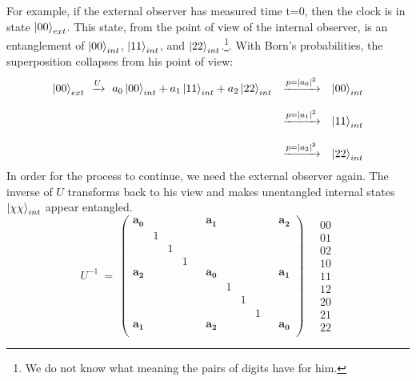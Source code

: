 \documentclass[12pt]{article}
\begin{document}
For example, if the external observer has measured time t=0, then the clock is in state $\ket{00}_{ext}$. This state, from the point of view of the internal observer, is an entanglement of $\ket{00}_{int}$, $\ket{11}_{int}$, and $\ket{22}_{int}$.\footnote{We do not know what meaning the pairs of digits have for him.}. With Born's probabilities, the superposition collapses from his point of view:
\begin{equation*}
\begin{matrix}
\ket{00}_{ext} \ \xrightarrow{U} \ a_0\ket{00}_{int} + a_1\ket{11}_{int} + a_2\ket{22}_{int} 
& \xrightarrow{p = |a_0|^2} & \ket{00}_{int} \\ \\
& \xrightarrow{p = |a_1|^2} & \ket{11}_{int} \\ \\
& \xrightarrow{p = |a_2|^2} & \ket{22}_{int}
\end{matrix}
\end{equation*}
In order for the process to continue, we need the external observer again. The inverse of $U$ transforms back to his view and makes unentangled internal states $\ket{\chi\chi}_{int}$ appear entangled.
\begin{equation}
U^{-1}\ =\ 
\begin{pmatrix}
\label{eq:not_U}
\pmb{a_0} &&&&& \pmb{a_1} &&&&& \pmb{a_2} \\
  & 1 &   &   &   &   &   &   &   &   &   \\
  &   & 1 &   &   &   &   &   &   &   &   \\
  &   &   & 1 &   &   &   &   &   &   &   \\
\pmb{a_2} &&&&& \pmb{a_0} &&&&& \pmb{a_1} \\
  &   &   &   &   &   & 1 &   &   &   &   \\
  &   &   &   &   &   &   & 1 &   &   &   \\
  &   &   &   &   &   &   &   & 1 &   &   \\
\pmb{a_1} &&&&& \pmb{a_2} &&&&& \pmb{a_0} \\
\end{pmatrix}
\quad
\begin{matrix}
00 \\ 01 \\ 02 \\ 10 \\ 11 \\ 12 \\ 20 \\ 21 \\ 22 
\end{matrix}
\end{equation}
\end{document}
